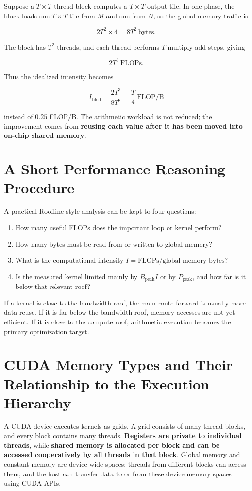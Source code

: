 \documentclass[11pt,a4paper]{article}
\begin{document}
Suppose a $T\times T$ thread block computes a $T\times T$ output tile. In one phase, the block loads one $T\times T$ tile from $M$ and one from $N$, so the global-memory traffic is

\[
    2T^2\times 4 = 8T^2\ \text{bytes}.
\]

The block has $T^2$ threads, and each thread performs $T$ multiply-add steps, giving

\[
    2T^3\ \text{FLOPs}.
\]

Thus the idealized intensity becomes

\[
\boxed{
    I_{\text{tiled}}
    =
    \frac{2T^3}{8T^2}
    =
    \frac{T}{4}\ \text{FLOP/B}
}
\]

instead of $0.25$ FLOP/B. The arithmetic workload is not reduced; the improvement comes from \textbf{reusing each value after it has been moved into on-chip shared memory}.

\section{A Short Performance Reasoning Procedure}

A practical Roofline-style analysis can be kept to four questions:

\begin{enumerate}
    \item How many useful FLOPs does the important loop or kernel perform?
    \item How many bytes must be read from or written to global memory?
    \item What is the computational intensity $I=\text{FLOPs}/\text{global-memory bytes}$?
    \item Is the measured kernel limited mainly by $B_{\text{peak}}I$ or by $P_{\text{peak}}$, and how far is it below that relevant roof?
\end{enumerate}

If a kernel is close to the bandwidth roof, the main route forward is usually more data reuse. If it is far below the bandwidth roof, memory accesses are not yet efficient. If it is close to the compute roof, arithmetic execution becomes the primary optimization target.

\section{CUDA Memory Types and Their Relationship to the Execution Hierarchy}

A CUDA device executes kernels as grids. A grid consists of many thread blocks, and every block contains many threads. \textbf{Registers are private to individual threads}, while \textbf{shared memory is allocated per block and can be accessed cooperatively by all threads in that block}. Global memory and constant memory are device-wide spaces: threads from different blocks can access them, and the host can transfer data to or from these device memory spaces using CUDA APIs.
\end{document}
